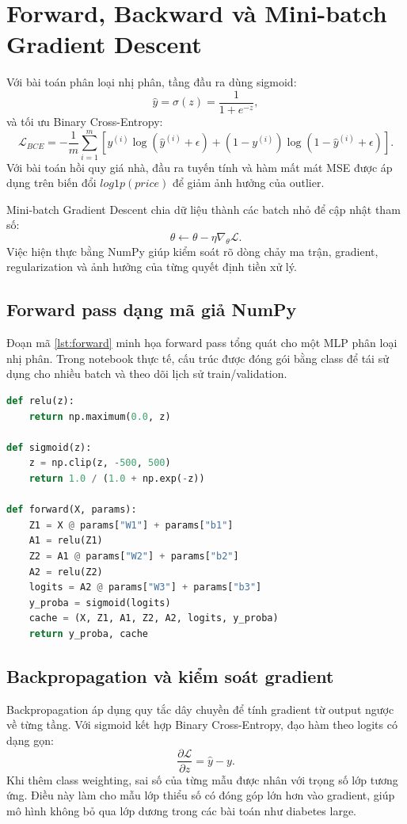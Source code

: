 \documentclass[12pt,a4paper]{report}
\begin{document}
\section{Forward, Backward và Mini-batch Gradient Descent}
Với bài toán phân loại nhị phân, tầng đầu ra dùng sigmoid:
\begin{equation}
    \hat{y} = \sigma(z) = \frac{1}{1 + e^{-z}},
\end{equation}
và tối ưu Binary Cross-Entropy:
\begin{equation}
    \mathcal{L}_{BCE} =
    -\frac{1}{m}\sum_{i=1}^{m}
    \left[y^{(i)}\log(\hat{y}^{(i)}+\epsilon)
    +(1-y^{(i)})\log(1-\hat{y}^{(i)}+\epsilon)\right].
\end{equation}
Với bài toán hồi quy giá nhà, đầu ra tuyến tính và hàm mất mát MSE được áp dụng trên biến đổi $log1p(price)$ để giảm ảnh hưởng của outlier.

Mini-batch Gradient Descent chia dữ liệu thành các batch nhỏ để cập nhật tham số:
\begin{equation}
    \theta \leftarrow \theta - \eta \nabla_{\theta}\mathcal{L}.
\end{equation}
Việc hiện thực bằng NumPy giúp kiểm soát rõ dòng chảy ma trận, gradient, regularization và ảnh hưởng của từng quyết định tiền xử lý.

\subsection{Forward pass dạng mã giả NumPy}
Đoạn mã \ref{lst:forward} minh họa forward pass tổng quát cho một MLP phân loại nhị phân.
Trong notebook thực tế, cấu trúc được đóng gói bằng class để tái sử dụng cho nhiều batch và theo dõi lịch sử train/validation.

\begin{lstlisting}[language=Python, caption={Forward pass MLP phân loại nhị phân bằng NumPy}, label={lst:forward}]
def relu(z):
    return np.maximum(0.0, z)

def sigmoid(z):
    z = np.clip(z, -500, 500)
    return 1.0 / (1.0 + np.exp(-z))

def forward(X, params):
    Z1 = X @ params["W1"] + params["b1"]
    A1 = relu(Z1)
    Z2 = A1 @ params["W2"] + params["b2"]
    A2 = relu(Z2)
    logits = A2 @ params["W3"] + params["b3"]
    y_proba = sigmoid(logits)
    cache = (X, Z1, A1, Z2, A2, logits, y_proba)
    return y_proba, cache
\end{lstlisting}

\subsection{Backpropagation và kiểm soát gradient}
Backpropagation áp dụng quy tắc dây chuyền để tính gradient từ output ngược về từng tầng.
Với sigmoid kết hợp Binary Cross-Entropy, đạo hàm theo logits có dạng gọn:
\begin{equation}
    \frac{\partial \mathcal{L}}{\partial z} = \hat{y} - y.
\end{equation}
Khi thêm class weighting, sai số của từng mẫu được nhân với trọng số lớp tương ứng.
Điều này làm cho mẫu lớp thiểu số có đóng góp lớn hơn vào gradient, giúp mô hình không bỏ qua lớp dương trong các bài toán như diabetes large.
\end{document}
